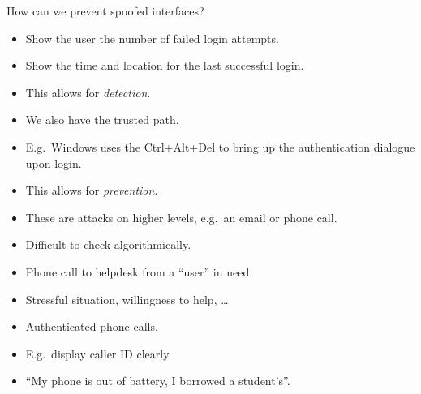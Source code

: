 \begin{frame}
  \begin{exercise}
    How can we prevent spoofed interfaces?
  \end{exercise}
\end{frame}

\begin{frame}
  \begin{example}
    \begin{itemize}
      \item Show the user the number of failed login attempts.
      \item Show the time and location for the last successful login.
      \item This allows for \emph{detection}.
    \end{itemize}
  \end{example}

  \begin{example}
    \begin{itemize}
      \item We also have the trusted path.
      \item E.g.\ Windows uses the Ctrl+Alt+Del to bring up the authentication 
        dialogue upon login.
      \item This allows for \emph{prevention}.
    \end{itemize}
  \end{example}
\end{frame}

\begin{frame}
  \begin{remark}
    \begin{itemize}
      \item These are attacks on higher levels, e.g.\ an email or phone call.
      \item Difficult to check algorithmically.
    \end{itemize}
  \end{remark}

  \begin{example}
    \begin{itemize}
      \item Phone call to helpdesk from a \enquote{user} in need.
      \item Stressful situation, willingness to help, \dots
    \end{itemize}
  \end{example}

  \pause{}
  
  \begin{example}[Solution?]
    \begin{itemize}
      \item Authenticated phone calls.
      \item E.g.\ display caller ID clearly.
      \item \enquote{My phone is out of battery, I borrowed a student's}.
    \end{itemize}
  \end{example}
\end{frame}

